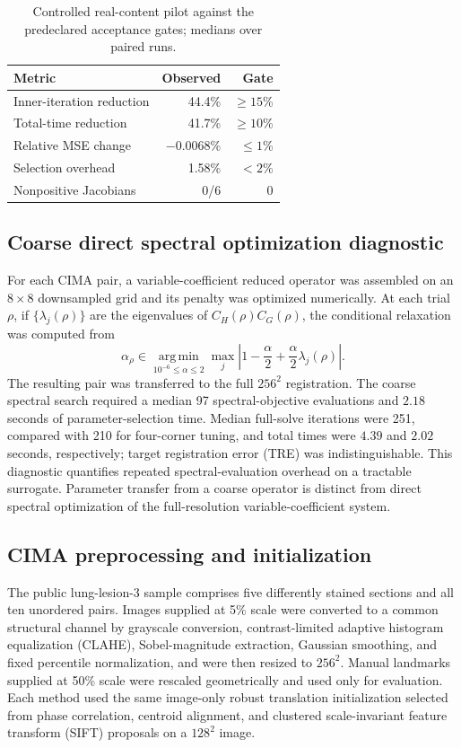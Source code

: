 \documentclass[11pt]{article}
\newcommand{\argmin}{\operatorname*{arg\,min}}
\begin{document}
\begin{table}[H]
\centering
\caption{Controlled real-content pilot against the predeclared acceptance
gates; medians over paired runs.}
\begin{tabular}{lrr}
\toprule
Metric & Observed & Gate\\
\midrule
Inner-iteration reduction & 44.4\% & $\ge15$\%\\
Total-time reduction & 41.7\% & $\ge10$\%\\
Relative MSE change & $-0.0068$\% & $\le1$\%\\
Selection overhead & 1.58\% & $<2$\%\\
Nonpositive Jacobians & 0/6 & 0\\
\bottomrule
\end{tabular}
\end{table}

\subsection{Coarse direct spectral optimization diagnostic}
For each CIMA pair, a variable-coefficient reduced operator was assembled on an
$8\times8$ downsampled grid and its penalty was optimized numerically. At each
trial $\rho$, if $\{\lambda_j(\rho)\}$ are the eigenvalues of
$C_H(\rho)C_G(\rho)$, the conditional relaxation was computed from
\[
\alpha_\rho\in\argmin_{10^{-6}\le\alpha\le2}
\max_j\left|1-\frac{\alpha}{2}
+\frac{\alpha}{2}\lambda_j(\rho)\right|.
\]
The resulting pair was transferred to the full $256^2$ registration. The
coarse spectral search required a median 97 spectral-objective evaluations and
$2.18$ seconds of parameter-selection time. Median full-solve iterations were
251, compared with 210 for four-corner tuning, and total times were $4.39$ and
$2.02$ seconds, respectively; target registration error (TRE) was
indistinguishable. This diagnostic quantifies repeated spectral-evaluation
overhead on a tractable surrogate. Parameter transfer from a coarse operator
is distinct from direct spectral optimization of the full-resolution
variable-coefficient system.

\subsection{CIMA preprocessing and initialization}
The public lung-lesion-3 sample comprises five differently stained sections
and all ten unordered pairs. Images supplied at 5\% scale were converted to a
common structural channel by grayscale conversion, contrast-limited adaptive
histogram equalization (CLAHE), Sobel-magnitude extraction, Gaussian smoothing,
and fixed percentile normalization, and were then resized to $256^2$. Manual
landmarks supplied at 50\% scale were rescaled geometrically and used only for
evaluation. Each method used the same image-only robust translation
initialization selected from phase correlation, centroid alignment, and
clustered scale-invariant feature transform (SIFT) proposals on a $128^2$
image.
\end{document}
